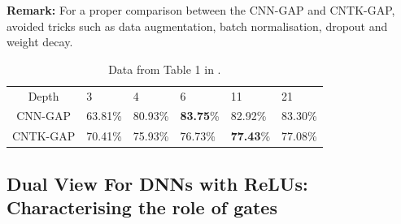 \textbf{Remark:} For a proper comparison between the  CNN-GAP and CNTK-GAP, \cite{arora2019exact} avoided tricks such as data augmentation, batch normalisation, dropout and weight decay.
\begin{table}
\begin{tabularx}{\columnwidth}{c *{5}{Y}}
\toprule 
Depth & 3 & 4 & 6&11 &21\\
CNN-GAP &63.81\% &80.93\% & \textbf{83.75}\% & 82.92\% & 83.30\%\\
CNTK-GAP &70.41\% &75.93\% & 76.73\% & \textbf{77.43}\% & 77.08\%\\
\bottomrule
\end{tabularx}
\caption{Data from Table 1 in \citep{arora2019exact}.}
\label{tb:cntk-cnn}
\end{table}



\subsection{Dual View For DNNs with ReLUs: Characterising the role of gates}

